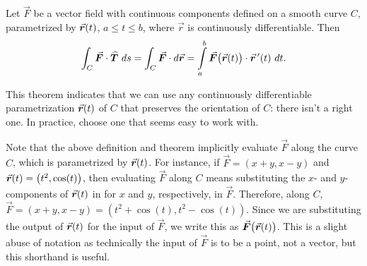 \begin{theorem}\label{idea:line2}
Let $\vec F$ be a vector field with continuous components defined on a smooth curve $C$, parametrized by $\vrt$, $a\leq t\leq b$, where $\vec r$ is continuously differentiable. Then
	$$\int_C\vec F\cdot\widehat T\ ds = \int_C \vec F\cdot d\vec r =\int\limits_a^b \vec F\big(\vec r(t)\big) \cdot \vrp(t)\ dt.$$
\end{theorem}

This theorem indicates that we can use any continuously differentiable parametrization $\vrt$ of $C$ that preserves the orientation of $C$: there isn't a right one. In practice, choose one that seems easy to work with. 

Note that the above definition and theorem implicitly evaluate $\vec F$ along the curve $C$, which is parametrized by $\vrt$. For instance, if $\vec F = \left( x+y, x-y\right)$ and $\vrt = \left( t^2,\cos(t)\right)$, then evaluating $\vec F$ along $C$ means substituting the $x$- and $y$-components of $\vrt$ in for $x$ and $y$, respectively, in $\vec F$. Therefore, along $C$, $\vec F = \left( x+y,x-y\right) = \left( t^2+\cos(t), t^2-\cos(t)\right)$. Since we are substituting the output of $\vrt$ for the input of $\vec F$, we write this as $\vec F\big(\vrt\big)$. This is a slight abuse of notation as technically the input of $\vec F$ is to be a point, not a vector, but this shorthand is useful.


